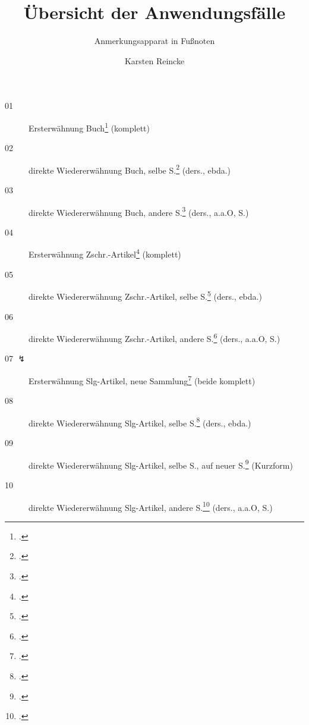 \documentclass[
  DIV=calc,
  BCOR=5mm,
  11pt,
  smallheadings,
  oneside,
  abstract=true,
  toc=bib,
  english,ngerman]{scrartcl}
\begin{document}
\nocite{*}

\titlehead{mycsrf.verify-: Deutsch}
\subject{(Geistes-) Wissenschaftliche Texte mit modifiziertem \textit{jurabib}}
\title{Übersicht der Anwendungsfälle}
\subtitle{Anmerkungsapparat in Fußnoten}
\author{Karsten Reincke}

\maketitle


\begin{description}

  \item[01 \checkmark] Ersterwähnung
    Buch\footcite[vgl.][12]{KantKdU1974} (komplett) 
  \item[02 \checkmark] direkte Wiedererwähnung
    Buch, selbe S.\footcite[vgl.][12]{KantKdU1974} (ders., ebda.)
  \item[03 \checkmark] direkte Wiedererwähnung
    Buch, andere S.\footcite[vgl.][13]{KantKdU1974} (ders., a.a.O, S.)
  \item[04 \checkmark] Ersterwähnung
    Zschr.-Artikel\footcite[vgl.][12]{McCarthy1980a} (komplett)
  \item[05 \checkmark] direkte Wiedererwähnung
    Zschr.-Artikel,
      selbe S.\footcite[vgl.][12]{McCarthy1980a} (ders., ebda.)
  \item[06 \checkmark] direkte Wiedererwähnung
    Zschr.-Artikel, 
      andere S.\footcite[vgl.][13]{McCarthy1980a} (ders., a.a.O, S.)
  
  \item[07 $\lightning$] Ersterwähnung 
    Slg-Artikel,
      neue Sammlung\footcite[vgl.][12]{Hays1985a} (beide komplett)
  \item[08 \checkmark] direkte Wiedererwähnung
    Slg-Artikel,
      selbe S.\footcite[vgl.][12]{Hays1985a} (ders., ebda.)
      
 \item[09 \checkmark] direkte Wiedererwähnung
    Slg-Artikel,
      selbe S.,
       auf neuer S.\footcite[vgl.][12]{Hays1985a} (Kurzform)
  \item[10 \checkmark] direkte Wiedererwähnung
    Slg-Artikel,
      andere S.\footcite[vgl.][13]{Hays1985a} (ders., a.a.O, S.)
     

\end{description}
\end{document}
